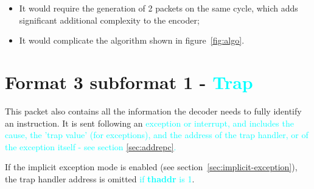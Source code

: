 \begin{itemize}
  \item It would require the generation of 2 packets on the same cycle, which adds significant additional complexity
    to the encoder;
  \item It would complicate the algorithm shown in figure~\ref{fig:algo}. 
\end{itemize}

\FloatBarrier
\section{Format 3 subformat 1 - \textcolor{cyan}{Trap}} \label{sec:format31}

This packet also contains all the information the decoder needs to fully identify an instruction.
It is sent following an \textcolor{cyan}{exception or interrupt, and includes the cause, 
the 'trap value' (for exceptions), and the address of the trap handler, or
of the exception itself - see section \ref{sec:addrepc}.}  

If the implicit exception mode is enabled (see section~\ref{sec:implicit-exception}), the trap handler 
address is omitted \textcolor{cyan}{if \textbf{thaddr} is 1}.

